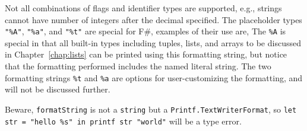 %
%
Not all combinations of flags and identifier types are supported, e.g., strings cannot have number of integers after the decimal specified.
The placeholder types \lstinline{"%A"}, \lstinline{"%a"}, and \lstinline{"%t"} are special for F\#, examples of their use are,
%
%
The \lstinline!%A! is special in that all built-in types including tuples, lists, and arrays to be discussed in Chapter~\ref{chap:lists} can be printed using this formatting string, but notice that the formatting performed includes the named literal string. The two formatting strings \lstinline!%t! and \lstinline!%a! are options for user-customizing the formatting, and will not be discussed further.

Beware, \lstinline[language=ebnf]!formatString! is not a \lstinline!string! but a \lstinline!Printf.TextWriterFormat!, so \lstinline!let str = "hello %s" in printf str "world"! will be a type error.

